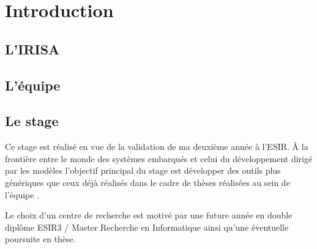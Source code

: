 \section*{Introduction} %

\subsection{L'IRISA}

\subsection{L'équipe \diver}


\subsection{Le stage}
Ce stage est réalisé en vue de la validation de ma deuxième année à l'ESIR. À la frontière entre le monde des systèmes embarqués et celui du développement dirigé par les modèles l'objectif principal du stage est développer des outils plus génériques que ceux déjà réalisés dans le cadre de thèses réalisées au sein de l'équipe \diver.

Le choix d'un centre de recherche est motivé par une future année en double diplôme ESIR3 / Master Recherche en Informatique ainsi qu'une éventuelle poursuite en thèse.